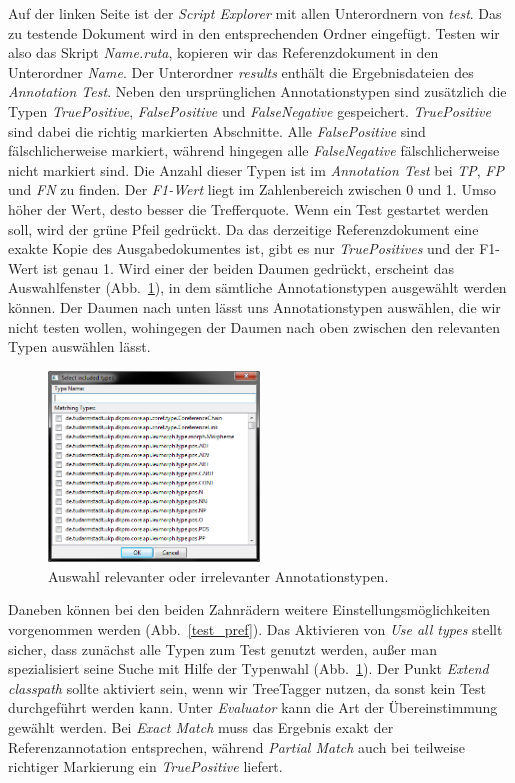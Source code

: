 \documentclass{article}
\begin{document}
Auf der linken Seite ist der \textit{Script Explorer} mit allen Unterordnern von \textit{test}. Das zu testende Dokument wird in den entsprechenden Ordner eingefügt. Testen wir also das Skript \textit{Name.ruta}, kopieren wir das Referenzdokument in den Unterordner \textit{Name}. Der Unterordner \textit{results} enthält die Ergebnisdateien des \textit{Annotation Test}. Neben den ursprünglichen Annotationstypen sind zusätzlich die Typen \textit{TruePositive}, \textit{FalsePositive} und \textit{FalseNegative} gespeichert. \textit{TruePositive} sind dabei die richtig markierten Abschnitte. Alle \textit{FalsePositive} sind fälschlicherweise markiert, während hingegen alle \textit{FalseNegative} fälschlicherweise nicht markiert sind. Die Anzahl dieser Typen ist im \textit{Annotation Test} bei \textit{TP}, \textit{FP} und \textit{FN} zu finden. Der \textit{F1-Wert} liegt im Zahlenbereich zwischen 0 und 1. Umso höher der Wert, desto besser die Trefferquote. Wenn ein Test gestartet werden soll, wird der grüne Pfeil gedrückt. Da das derzeitige Referenzdokument eine exakte Kopie des Ausgabedokumentes ist, gibt es nur \textit{TruePositives} und der F1-Wert ist genau 1. Wird einer der beiden Daumen gedrückt, erscheint das Auswahlfenster (Abb.~\ref{thumb}), in dem sämtliche Annotationstypen ausgewählt werden können. Der \glqq Daumen nach unten\grqq{} lässt uns Annotationstypen auswählen, die wir nicht testen wollen, wohingegen der \glqq Daumen nach oben\grqq{} zwischen den relevanten Typen auswählen lässt.

\begin{figure}
\centering
\includegraphics[width=0.5\textwidth]{figs/test_thumb.png}
\caption{Auswahl relevanter oder irrelevanter Annotationstypen.}
\label{thumb}
\end{figure}

Daneben können bei den beiden Zahnrädern weitere Ein\-stel\-lungs\-mög\-lich\-kei\-ten vorgenommen werden (Abb.~\ref{test_pref}). Das Aktivieren von \textit{Use all types} stellt sicher, dass zunächst alle Typen zum Test genutzt werden, außer man spezialisiert seine Suche mit Hilfe der Typenwahl (Abb.~\ref{thumb}). Der Punkt \textit{Extend classpath} sollte aktiviert sein, wenn wir TreeTagger nutzen, da sonst kein Test durchgeführt werden kann. Unter \textit{Evaluator} kann die Art der Übereinstimmung gewählt werden. Bei \textit{Exact Match} muss das Ergebnis exakt der Referenzannotation entsprechen, während \textit{Partial Match} auch bei teilweise richtiger Markierung ein \textit{TruePositive} liefert.
\end{document}

